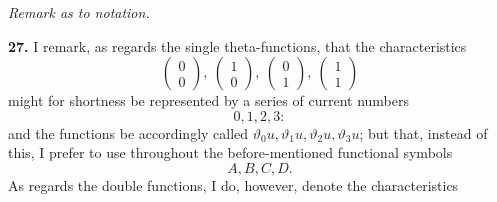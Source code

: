 \documentclass[11pt]{article}
\begin{document}
\medskip

\textit{Remark as to notation.}

\medskip

\textbf{27.} I remark, as regards the single theta-functions, that the characteristics
\[
\begin{pmatrix} 0 \\ 0 \end{pmatrix},\ \begin{pmatrix} 1 \\ 0 \end{pmatrix},\ \begin{pmatrix} 0 \\ 1 \end{pmatrix},\ \begin{pmatrix} 1 \\ 1 \end{pmatrix}
\]
might for shortness be represented by a series of current numbers
\[
0, 1, 2, 3:
\]
and the functions be accordingly called $\vartheta_0 u, \vartheta_1 u, \vartheta_2 u, \vartheta_3 u$; but that, instead of this, I prefer to use throughout the before-mentioned functional symbols
\[
A, B, C, D.
\]
As regards the double functions, I do, however, denote the characteristics
\end{document}
